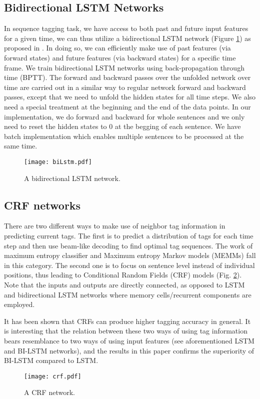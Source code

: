 \documentclass[11pt,a4paper]{article}
\begin{document}
\subsection{Bidirectional LSTM Networks}

In sequence tagging task, we have access to both past and future input features for a given time, we can thus utilize a bidirectional LSTM network (Figure \ref{fig:biLstm}) as proposed in \cite{graves3}.  In doing so, we can efficiently make use of past features (via forward states) and future features (via backward states) for a specific time frame. We train bidirectional LSTM networks using back-propagation through time (BPTT)\cite{boden1}. The forward and backward passes over the unfolded network over time are carried out in a similar way to regular network forward and backward passes, except that we need to unfold the hidden states for all time steps.  We also need a special treatment at the beginning and the end of the data points. In our implementation, we do forward and backward for whole sentences and we only need to reset the hidden states to 0 at the begging of each sentence. We have batch implementation which enables multiple sentences to be processed at the same time.  

\begin{figure}[!htb]
	\centering
		\texttt{[image: biLstm.pdf]}
	\caption{A bidirectional LSTM network.}
	\label{fig:biLstm}
\end{figure} 

\subsection{CRF networks}
There are two different ways to make use of neighbor tag information in predicting current tags.  The first is to predict a distribution of tags for each time step and then use beam-like decoding to find optimal tag sequences. The work of maximum entropy classifier \cite{ratnaparkhi1} and Maximum entropy Markov models (MEMMs) \cite{mcCallum1} fall in this category. The second one is to focus on sentence level instead of individual positions, thus leading to Conditional Random Fields (CRF) models \cite{lafferty1} (Fig. \ref{fig:crf}). Note that the inputs and outputs are directly connected, as opposed to LSTM and  bidirectional LSTM networks where memory cells/recurrent components are employed.

It has been shown that CRFs can produce higher tagging accuracy in general. It is interesting that the relation between these two ways of using tag information bears resemblance to two ways of using input features (see aforementioned LSTM and BI-LSTM networks), and the results in this paper confirms the superiority of BI-LSTM compared to LSTM.
\begin{figure}[htb]
	\centering
		\texttt{[image: crf.pdf]}
	\caption{A CRF network.}
	\label{fig:crf}
\end{figure} 
\end{document}

